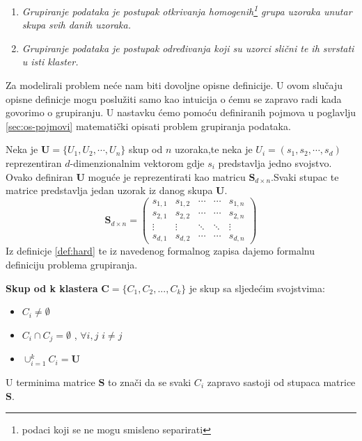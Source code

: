 \documentclass[a4paper,twoside,12pt]{memoir} %
\begin{document}
\begin{enumerate}
\item \textit{Grupiranje podataka je postupak otkrivanja homogenih\footnote{podaci koji se ne mogu smisleno separirati} grupa uzoraka unutar skupa svih danih uzoraka.}

\item \textit{Grupiranje podataka je postupak određivanja koji su uzorci slični te ih svrstati u isti klaster.}
\end{enumerate}
Za modelirali problem neće nam biti dovoljne opisne definicije. U ovom slučaju opisne definicje mogu poslužiti samo kao intuicija o ćemu se zapravo radi kada govorimo o grupiranju. U nastavku ćemo pomoću definiranih pojmova u poglavlju \ref{sec:os-pojmovi} matematički opisati problem grupiranja podataka.

Neka je $\mathbf{U} = \{U_1,U_2,\cdots,U_n\} $ skup od $n$ uzoraka,te neka je $U_i = (s_1,s_2,\cdots,s_d)$ reprezentiran $d$-dimenzionalnim vektorom gdje $s_i$ predstavlja jedno svojstvo. Ovako definiran $\mathbf{U}$ moguće je reprezentirati kao matricu $\mathbf{S}_{d\times n}$.Svaki stupac te matrice predstavlja jedan uzorak iz danog skupa $\mathbf{U}$.
\begin{equation}
\label{equ:matrica-uzoraka}
\mathbf{S}_{d \times n} = 
\begin{pmatrix}
s_{1,1} & s_{1,2} & \cdots & \cdots & s_{1,n}\\
s_{2,1} & s_{2,2} & \cdots & \cdots & s_{2,n}\\
\vdots & \vdots & \ddots & \ddots & \vdots\\
s_{d,1} & s_{d,2} & \cdots & \cdots & s_{d,n}
\end{pmatrix}
\end{equation}
Iz definicje \ref{def:hard} te iz navedenog formalnog zapisa dajemo formalnu definiciju problema grupiranja.
\begin{defn}
\label{def:k-klaster}
\textbf{Skup od k klastera} $\mathbf{C} = \{C_1,C_2,...,C_k\}$ je skup sa sljedećim svojstvima:
\begin{itemize}
\item $C_i \neq \emptyset$
\item $C_i \cap C_j = \emptyset$ , $\forall i,j$ $ i \neq j$
\item $\cup_{i=1}^{k}C_i = \mathbf{U} $
\end{itemize} 
\end{defn}
\begin{rem}
\label{nap:ZC}
U terminima matrice $\mathbf{S}$ to znači da se svaki $C_i$ zapravo sastoji od stupaca matrice $\mathbf{S}$.
\end{rem}
\end{document}
